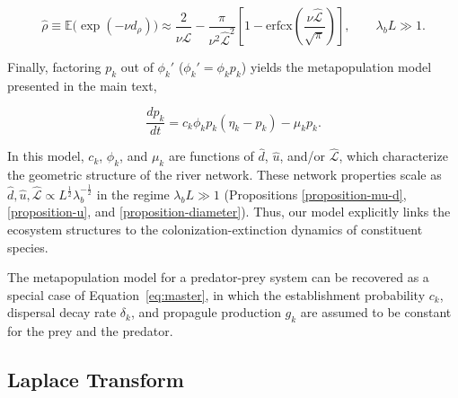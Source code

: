 \documentclass[11pt, class=article, crop=false]{standalone}
\theoremstyle{definition}
\begin{document}
\begin{equation}
    \hat{\rho} \equiv \mathbb{E}\bigl(\exp({-\nu d_{\rho}})\bigr)
    \approx
    \frac{2}{\nu \hat{\mathcal{L}}} 
            - 
            \frac{\pi}{\nu^2 \hat{\mathcal{L}}^2} 
            \left[
                1 
                - 
                \mathrm{erfcx}
                \left(
                \frac{\nu \hat{\mathcal{L}}}{\sqrt{\pi}}
                \right)
            \right],
    \qquad
    \lambda_b L \gg 1.
\end{equation}

Finally, factoring $p_k$ out of $\phi_k'$ ($\phi_k' = \phi_k p_k$) yields the metapopulation model presented in the main text,

\begin{equation}
    \frac{dp_k}{dt} = c_k \phi_k p_k (\eta_k - p_{k}) - \mu_{k} p_{k}.
    \label{eq:master}
\end{equation}

In this model, $c_k$, $\phi_k$, and $\mu_k$ are functions of $\hat{d}$, $\hat{u}$, and/or $\hat{\mathcal{L}}$, which characterize the geometric structure of the river network.
These network properties scale as
$\hat{d}, \hat{u}, \hat{\mathcal{L}} \propto L^{\frac{1}{2}} \lambda_b^{-\frac{1}{2}}$ in the regime $\lambda_b L \gg 1$ (Propositions \ref{proposition-mu-d}, \ref{proposition-u}, and \ref{proposition-diameter}).
Thus, our model explicitly links the ecosystem structures to the colonization-extinction dynamics of constituent species.

The metapopulation model for a predator-prey system can be recovered as a special case of Equation~\ref{eq:master}, in which the establishment probability $c_k$, dispersal decay rate $\delta_k$, and propagule production $g_k$ are assumed to be constant for the prey and the predator.

\newpage

\subsection{Laplace Transform}
\end{document}
